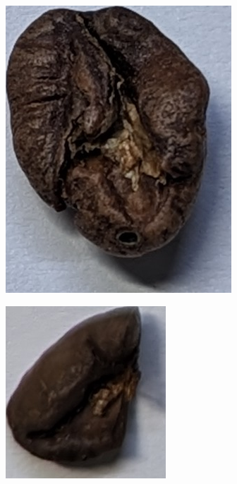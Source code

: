 \begin{figure}[h]
\begin{subfigure}
{			./figures/methodology/normal-bean
		}
		 \label{fig:normalBeanSingle}
	\end{subfigure}
	\begin{subfigure}
		{0.2\textwidth}
		\includegraphics[height=0.8\linewidth, keepaspectratio]{
			./figures/methodology/insect-damaged-bean
		}
		 \label{fig:insectBeanSingle}
	\end{subfigure}
	\begin{subfigure}
		{0.2\textwidth}
		\includegraphics[height=0.8\linewidth, keepaspectratio]{
			./figures/methodology/bean-fragment
}
\end{subfigure}
\end{figure}
